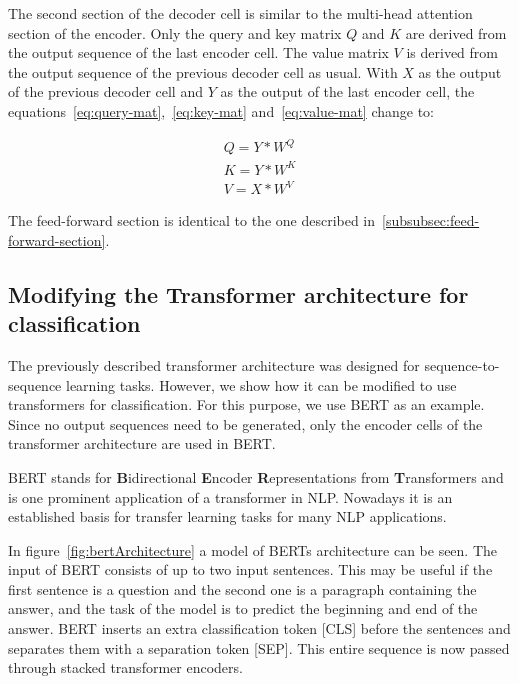 \documentclass[a4paper]{scrartcl}
\begin{document}
    The second section of the decoder cell is similar to the multi-head attention section of the encoder.
    Only the query and key matrix $Q$ and $K$ are derived from the output sequence of the last encoder cell.
    The value matrix $V$ is derived from the output sequence of the previous decoder cell as usual.
    With $X$ as the output of the previous decoder cell and $Y$ as the output of the last encoder cell, the equations~\ref{eq:query-mat},~\ref{eq:key-mat} and~\ref{eq:value-mat} change to:

    \begin{gather}
        Q = Y * W^Q \\
        K = Y * W^K \\
        V = X * W^V
    \end{gather}

    The feed-forward section is identical to the one described in~\ref{subsubsec:feed-forward-section}.

    \subsection{Modifying the Transformer architecture for classification}\label{subsec:using-transformers-for-classification}
    The previously described transformer architecture was designed for sequence-to-sequence learning tasks.
    However, we show how it can be modified to use transformers for classification.
    For this purpose, we use BERT as an example.
    Since no output sequences need to be generated, only the encoder cells of the transformer architecture are used in BERT\@.

    BERT stands for \textbf{B}idirectional \textbf{E}ncoder \textbf{R}epresentations from \textbf{T}ransformers and is one prominent application of a transformer in NLP\@.
    Nowadays it is an established basis for transfer learning tasks for many NLP applications.

    In figure~\ref{fig:bertArchitecture} a model of BERTs architecture can be seen.
    The input of BERT consists of up to two input sentences.
    This may be useful if the first sentence is a question and the second one is a paragraph containing the answer, and the task of the model is to predict the beginning and end of the answer.
    BERT inserts an extra classification token [CLS] before the sentences and separates them with a separation token [SEP].
    This entire sequence is now passed through stacked transformer encoders.
\end{document}
